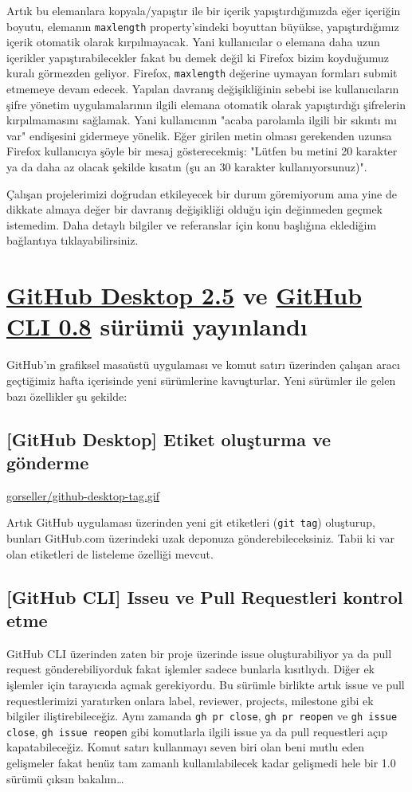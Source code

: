 \documentclass[11pt]{article}
\begin{document}
Artık bu elemanlara kopyala/yapıştır ile bir içerik yapıştırdığımızda eğer
içeriğin boyutu, elemanın \texttt{maxlength} property'sindeki boyuttan büyükse,
yapıştırdığımız içerik otomatik olarak kırpılmayacak. Yani kullanıcılar o
elemana daha uzun içerikler yapıştırabilecekler fakat bu demek değil ki
Firefox bizim koyduğumuz kuralı görmezden geliyor. Firefox, \texttt{maxlength}
değerine uymayan formları submit etmemeye devam edecek. Yapılan davranış
değişikliğinin sebebi ise kullanıcıların şifre yönetim uygulamalarının ilgili
elemana otomatik olarak yapıştırdığı şifrelerin kırpılmamasını sağlamak. Yani
kullanıcının "acaba parolamla ilgili bir sıkıntı mı var" endişesini gidermeye
yönelik. Eğer girilen metin olması gerekenden uzunsa Firefox kullanıcıya şöyle
bir mesaj gösterecekmiş: "Lütfen bu metini 20 karakter ya da daha az olacak
şekilde kısatın (şu an 30 karakter kullanıyorsunuz)".

Çalışan projelerimizi doğrudan etkileyecek bir durum göremiyorum ama yine de
dikkate almaya değer bir davranış değişikliği olduğu için değinmeden geçmek
istemedim. Daha detaylı bilgiler ve referanslar için konu başlığına eklediğim
bağlantıya tıklayabilirsiniz.
\section{\href{https://github.blog/changelog/2020-05-11-github-cli-allows-you-to-close-reopen-and-add-metadata-to-issues-and-pull-requests/}{GitHub Desktop 2.5} ve \href{https://github.blog/changelog/2020-05-11-github-cli-allows-you-to-close-reopen-and-add-metadata-to-issues-and-pull-requests/}{GitHub CLI 0.8} sürümü yayınlandı}
\label{sec:org6e09198}
GitHub'ın grafiksel masaüstü uygulaması ve komut satırı üzerinden çalışan
aracı geçtiğimiz hafta içerisinde yeni sürümlerine kavuşturlar. Yeni sürümler
ile gelen bazı özellikler şu şekilde:
\subsection{[GitHub Desktop] Etiket oluşturma ve gönderme}
\label{sec:org9115f30}
\url{gorseller/github-desktop-tag.gif}

Artık GitHub uygulaması üzerinden yeni git etiketleri (\texttt{git tag}) oluşturup,
bunları GitHub.com üzerindeki uzak deponuza gönderebileceksiniz. Tabii ki
var olan etiketleri de listeleme özelliği mevcut.
\subsection{[GitHub CLI] Isseu ve Pull Requestleri kontrol etme}
\label{sec:orgf37feeb}
GitHub CLI üzerinden zaten bir proje üzerinde issue oluşturabiliyor ya da
pull request gönderebiliyorduk fakat işlemler sadece bunlarla kısıtlıydı.
Diğer ek işlemler için tarayıcıda açmak gerekiyordu. Bu sürümle birlikte
artık issue ve pull requestlerimizi yaratırken onlara label, reviewer,
projects, milestone gibi ek bilgiler iliştirebileceğiz. Aynı zamanda \texttt{gh pr
	 close}, \texttt{gh pr reopen} ve \texttt{gh issue close}, \texttt{gh issue reopen} gibi komutlarla
ilgili issue ya da pull requestleri açıp kapatabileceğiz. Komut satırı
kullanmayı seven biri olan beni mutlu eden gelişmeler fakat henüz tam zamanlı
kullanılabilecek kadar gelişmedi hele bir 1.0 sürümü çıksın bakalım\ldots{}
\end{document}
